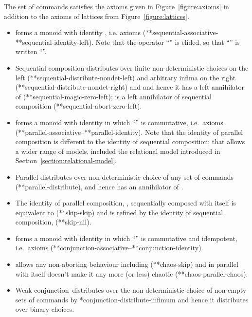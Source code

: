 \documentclass[fleqn]{fac}
\makeatletter
\def\refaxiom{\@ifnextchar*{\@refaxiom}{\@@refaxiom}}
\def\@refaxiom*#1{\ref{axiom-#1}\index{Axiom!#1|LawUse}}
\def\@@refaxiom#1{axiom~(\ref{axiom-#1})\index{Axiom!#1|LawUse}}
\def\refproperty{\@ifnextchar*{\@refproperty}{\@@refproperty}}
\def\@refproperty*#1{\ref{property-#1}\index{Property!#1|LawUse}}
\def\@@refproperty#1{property~(\ref{property-#1})\index{Property!#1|LawUse}}
\newcommand{\Strictconjunction}{Weak conjunction}
\makeatother
\begin{document}
 
\begin{definitionx}
The set of commands  satisfies the axioms given in Figure~\ref{figure:axioms}
in addition to the axioms of lattices from Figure~\ref{figure:lattices}.
\end{definitionx}
\begin{itemize}
\item
 forms a monoid with identity , i.e. axioms (\refaxiom*{sequential-associative}-\refaxiom*{sequential-identity-left}).
Note that the operator ``'' is elided, so that ``'' is written ``''. 
\item
Sequential composition distributes over finite non-deterministic choices on the left (\refaxiom*{sequential-distribute-nondet-left}) 
and arbitrary infima on the right (\refaxiom*{sequential-distribute-nondet-right}) and 
and hence it has a left annihilator of   (\refproperty*{sequential-magic-zero-left});
 is a left annihilator of sequential composition  (\refaxiom*{sequential-abort-zero-left}). 
 
\item
 forms a monoid with identity  in which ``'' is commutative, i.e.\ axioms 
(\refaxiom*{parallel-associative}--\refaxiom*{parallel-identity}).
Note that the identity of parallel composition is different to the identity of sequential composition;
that allows a wider range of models, included the relational model introduced in Section~\ref{section:relational-model}.
\item
Parallel distributes over non-deterministic choice of any set of commands
(\refaxiom*{parallel-distribute}),
and hence 
has an annihilator of .

\item
The identity of parallel composition, , sequentially composed with itself is equivalent to  (\refaxiom*{skip-skip})
and is refined by the identity of sequential composition,  (\refaxiom*{skip-nil}).

\item
 forms a monoid with identity  in which ``'' is commutative and idempotent, 
i.e.\ axioms (\refaxiom*{conjunction-associative}--\refaxiom*{conjunction-identity}).
\item
 allows any non-aborting behaviour including  (\refaxiom*{chaos-skip})
and  in parallel with itself doesn't make it any more (or less) chaotic (\refaxiom*{chaos-parallel-chaos}).
\item
\Strictconjunction\ distributes over the non-deterministic choice of non-empty sets of commands by \refaxiom{conjunction-distribute-infimum}
and hence it distributes over binary choices.


\end{itemize}
\end{document}
